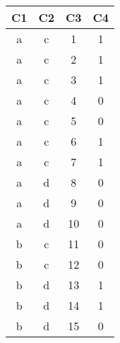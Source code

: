 \begin{tabular}{cccc}
\toprule
C1 & C2 & C3 & C4\\
\midrule
a & c & 1 & 1\\
a & c & 2 & 1\\
a & c & 3 & 1\\
a & c & 4 & 0\\
a & c & 5 & 0\\
\addlinespace
a & c & 6 & 1\\
a & c & 7 & 1\\
a & d & 8 & 0\\
a & d & 9 & 0\\
a & d & 10 & 0\\
\addlinespace
b & c & 11 & 0\\
b & c & 12 & 0\\
b & d & 13 & 1\\
b & d & 14 & 1\\
b & d & 15 & 0\\
\bottomrule
\end{tabular}
